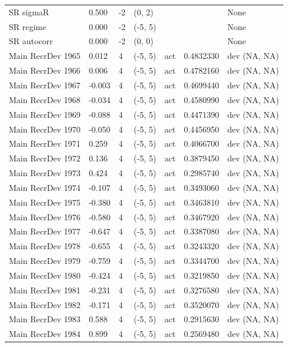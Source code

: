 \documentclass[
  english,
  a4paper,
]{article}
\begin{document}
\begin{landscape}
\begin{longtable}[t]{lllllll}
SR sigmaR & 0.500 & -2 & (0, 2) &  &  & None\\
\addlinespace
SR regime & 0.000 & -2 & (-5, 5) &  &  & None\\
SR autocorr & 0.000 & -2 & (0, 0) &  &  & None\\
Main RecrDev 1965 & 0.012 & 4 & (-5, 5) & act & 0.4832330 & dev (NA, NA)\\
Main RecrDev 1966 & 0.006 & 4 & (-5, 5) & act & 0.4782160 & dev (NA, NA)\\
Main RecrDev 1967 & -0.003 & 4 & (-5, 5) & act & 0.4699440 & dev (NA, NA)\\
\addlinespace
Main RecrDev 1968 & -0.034 & 4 & (-5, 5) & act & 0.4580990 & dev (NA, NA)\\
Main RecrDev 1969 & -0.088 & 4 & (-5, 5) & act & 0.4471390 & dev (NA, NA)\\
Main RecrDev 1970 & -0.050 & 4 & (-5, 5) & act & 0.4456950 & dev (NA, NA)\\
Main RecrDev 1971 & 0.259 & 4 & (-5, 5) & act & 0.4066700 & dev (NA, NA)\\
Main RecrDev 1972 & 0.136 & 4 & (-5, 5) & act & 0.3879450 & dev (NA, NA)\\
\addlinespace
Main RecrDev 1973 & 0.424 & 4 & (-5, 5) & act & 0.2985740 & dev (NA, NA)\\
Main RecrDev 1974 & -0.107 & 4 & (-5, 5) & act & 0.3493060 & dev (NA, NA)\\
Main RecrDev 1975 & -0.380 & 4 & (-5, 5) & act & 0.3463810 & dev (NA, NA)\\
Main RecrDev 1976 & -0.580 & 4 & (-5, 5) & act & 0.3467920 & dev (NA, NA)\\
Main RecrDev 1977 & -0.647 & 4 & (-5, 5) & act & 0.3387080 & dev (NA, NA)\\
\addlinespace
Main RecrDev 1978 & -0.655 & 4 & (-5, 5) & act & 0.3243320 & dev (NA, NA)\\
Main RecrDev 1979 & -0.759 & 4 & (-5, 5) & act & 0.3344700 & dev (NA, NA)\\
Main RecrDev 1980 & -0.424 & 4 & (-5, 5) & act & 0.3219850 & dev (NA, NA)\\
Main RecrDev 1981 & -0.231 & 4 & (-5, 5) & act & 0.3276580 & dev (NA, NA)\\
Main RecrDev 1982 & -0.171 & 4 & (-5, 5) & act & 0.3520070 & dev (NA, NA)\\
\addlinespace
Main RecrDev 1983 & 0.588 & 4 & (-5, 5) & act & 0.2915630 & dev (NA, NA)\\
Main RecrDev 1984 & 0.899 & 4 & (-5, 5) & act & 0.2569480 & dev (NA, NA)\\

\end{longtable}
\end{landscape}
\end{document}
